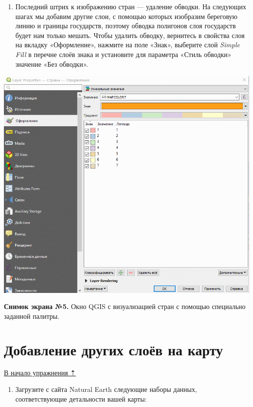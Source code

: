 \documentclass[
  12pt,
]{book}
\providecommand{\tightlist}{%
  \setlength{\itemsep}{0pt}\setlength{\parskip}{0pt}}
\begin{document}
\begin{enumerate}
\def\labelenumi{\arabic{enumi}.}
\setcounter{enumi}{15}
\tightlist
\item
  Последний штрих к изображению стран --- удаление обводки. На следующих шагах мы добавим другие слои, с помощью которых изобразим береговую линию и границы государств, поэтому обводка полигонов слоя государств будет нам только мешать. Чтобы удалить обводку, вернитесь в свойства слоя на вкладку «Оформление», нажмите на поле «Знак», выберите слой \emph{Simple Fill} в перечне слоёв знака и установите для параметра «Стиль обводки» значение «Без обводки».
\end{enumerate}

\includegraphics{images/Ex01_WorldMap/outline.gif}

\textbf{Снимок экрана №5.} Окно QGIS с визуализацией стран с помощью специально заданной палитры.

\hypertarget{map-design-world-other-layers}{%
\section{Добавление других слоёв на карту}\label{map-design-world-other-layers}}

\protect\hyperlink{map-design-world}{В начало упражнения ⇡}

\begin{enumerate}
\def\labelenumi{\arabic{enumi}.}
\tightlist
\item
  Загрузите с сайта Natural Earth следующие наборы данных, соответствующие детальности вашей карты:
\end{enumerate}
\end{document}
